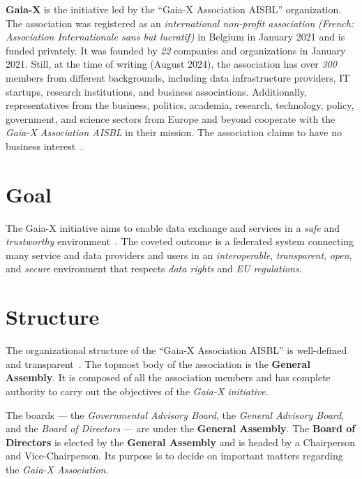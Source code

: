 \textbf{Gaia-X} is the initiative led by the ``Gaia-X Association AISBL'' organization.
The association was registered as an \textit{international non-profit association} \textit{(French: Association Internationale sans but lucratif)} in Belgium in January 2021 and is funded privately.
It was founded by \textit{22} companies and organizations in January 2021.
Still, at the time of writing (August 2024), the association has over \textit{300} members from different backgrounds, including data infrastructure providers, IT startups, research institutions, and business associations.
Additionally, representatives from the business, politics, academia, research, technology, policy, government, and science sectors from Europe and beyond cooperate with the \textit{Gaia-X Association AISBL} in their mission.
The association claims to have no business interest~\cite{gaiax}.

\section{Goal}\label{sec:gaia-x-goal}

The Gaia-X initiative aims to enable data exchange and services in a \textit{safe} and \textit{trustworthy} environment~\cite{gaiax}.
The coveted outcome is a federated system connecting many service and data providers and users in an \textit{interoperable}, \textit{transparent}, \textit{open}, and \textit{secure} environment that respects \textit{data rights} and \textit{EU regulations}.

\section{Structure}\label{sec:the-structure}

The organizational structure of the ``Gaia-X Association AISBL'' is well-defined and transparent~\cite{gaiax}.
The topmost body of the association is the \textbf{General Assembly}.
It is composed of all the association members and has complete authority to carry out the objectives of the \textit{Gaia-X initiative}.

The boards --- the \textit{Governmental Advisory Board}, the \textit{General Advisory Board}, and the \textit{Board of Directors} --- are under the \textbf{General Assembly}.
The \textbf{Board of Directors} is elected by the \textbf{General Assembly} and is headed by a Chairperson and Vice-Chairperson.
Its purpose is to decide on important matters regarding the \textit{Gaia-X Association}.


